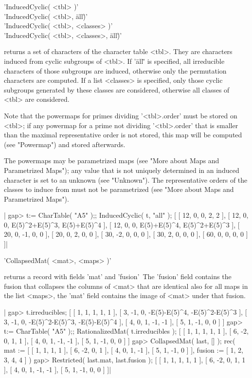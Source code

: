 %

'InducedCyclic( <tbl> )'\\
'InducedCyclic( <tbl>, \"all\" )'\\
'InducedCyclic( <tbl>, <classes> )'\\
'InducedCyclic( <tbl>, <classes>, \"all\" )'

returns a set  of   characters of the  character  table  <tbl>. They  are
characters  induced  from  cyclic subgroups of    <tbl>.  If '\"all\"' is
specified, all irreducible   characters of those  subgroups are  induced,
otherwise  only the  permutation  characters  are  computed.  If  a  list
<classes> is specified, only  those  cyclic subgroups generated by  these
classes are considered, otherwise all classes of <tbl> are considered.

Note that the powermaps for primes dividing  '<tbl>.order' must be stored
on <tbl>; if any powermap for a prime not  dividing '<tbl>.order' that is
smaller than  the maximal representative  order  is not  stored, this map
will be computed (see "Powermap") and stored afterwards.

The   powermaps may be parametrized    maps   (see "More about Maps   and
Parametrized Maps");  any value  that is not   uniquely determined  in an
induced  character    is  set  to  an  unknown    (see  "Unknown").   The
representative orders     of the  classes  to induce     from must not be
parametrized (see "More about Maps and Parametrized Maps").

|    gap> t:= CharTable( "A5" );; InducedCyclic( t, "all" );
    [ [ 12, 0, 0, 2, 2 ], [ 12, 0, 0, E(5)^2+E(5)^3, E(5)+E(5)^4 ],
      [ 12, 0, 0, E(5)+E(5)^4, E(5)^2+E(5)^3 ], [ 20, 0, -1, 0, 0 ],
      [ 20, 0, 2, 0, 0 ], [ 30, -2, 0, 0, 0 ], [ 30, 2, 0, 0, 0 ],
      [ 60, 0, 0, 0, 0 ] ]|

%

'CollapsedMat( <mat>, <maps> )'

returns  a record  with fields  'mat' and 'fusion'\:\  The 'fusion' field
contains the   fusion  that collapses  the  columns   of <mat>  that  are
identical also for all maps in the list  <maps>, the 'mat' field contains
the image of <mat> under that fusion.

|    gap> t.irreducibles;
    [ [ 1, 1, 1, 1, 1 ], [ 3, -1, 0, -E(5)-E(5)^4, -E(5)^2-E(5)^3 ],
      [ 3, -1, 0, -E(5)^2-E(5)^3, -E(5)-E(5)^4 ], [ 4, 0, 1, -1, -1 ],
      [ 5, 1, -1, 0, 0 ] ]
    gap> t:= CharTable( "A5" );; RationalizedMat( t.irreducibles );
    [ [ 1, 1, 1, 1, 1 ], [ 6, -2, 0, 1, 1 ], [ 4, 0, 1, -1, -1 ],
      [ 5, 1, -1, 0, 0 ] ]
    gap> CollapsedMat( last, [] );
    rec(
      mat := [ [ 1, 1, 1, 1 ], [ 6, -2, 0, 1 ], [ 4, 0, 1, -1 ],
          [ 5, 1, -1, 0 ] ],
      fusion := [ 1, 2, 3, 4, 4 ] )
    gap> Restricted( last.mat, last.fusion );
    [ [ 1, 1, 1, 1, 1 ], [ 6, -2, 0, 1, 1 ], [ 4, 0, 1, -1, -1 ],
      [ 5, 1, -1, 0, 0 ] ]|

